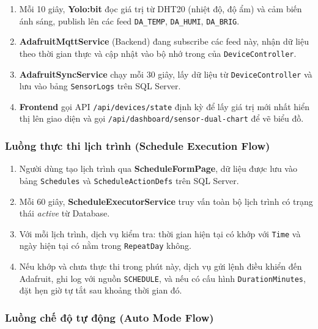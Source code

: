 \begin{enumerate}
    \item Mỗi 10 giây, \textbf{Yolo:bit} đọc giá trị từ DHT20 (nhiệt độ, độ ẩm) và cảm biến ánh sáng, publish lên các feed \texttt{DA\_TEMP}, \texttt{DA\_HUMI}, \texttt{DA\_BRIG}.
    \item \textbf{AdafruitMqttService} (Backend) đang subscribe các feed này, nhận dữ liệu theo thời gian thực và cập nhật vào bộ nhớ trong của \texttt{DeviceController}.
    \item \textbf{AdafruitSyncService} chạy mỗi 30 giây, lấy dữ liệu từ \texttt{DeviceController} và lưu vào bảng \texttt{SensorLogs} trên SQL Server.
    \item \textbf{Frontend} gọi API \texttt{/api/devices/state} định kỳ để lấy giá trị mới nhất hiển thị lên giao diện và gọi \texttt{/api/dashboard/sensor-dual-chart} để vẽ biểu đồ.
\end{enumerate}

\subsubsection{Luồng thực thi lịch trình (Schedule Execution Flow)}

\begin{enumerate}
    \item Người dùng tạo lịch trình qua \textbf{ScheduleFormPage}, dữ liệu được lưu vào bảng \texttt{Schedules} và \texttt{ScheduleActionDefs} trên SQL Server.
    \item Mỗi 60 giây, \textbf{ScheduleExecutorService} truy vấn toàn bộ lịch trình có trạng thái \textit{active} từ Database.
    \item Với mỗi lịch trình, dịch vụ kiểm tra: thời gian hiện tại có khớp với \texttt{Time} và ngày hiện tại có nằm trong \texttt{RepeatDay} không.
    \item Nếu khớp và chưa thực thi trong phút này, dịch vụ gửi lệnh điều khiển đến Adafruit, ghi log với nguồn \texttt{SCHEDULE}, và nếu có cấu hình \texttt{DurationMinutes}, đặt hẹn giờ tự tắt sau khoảng thời gian đó.
\end{enumerate}

\subsubsection{Luồng chế độ tự động (Auto Mode Flow)}

